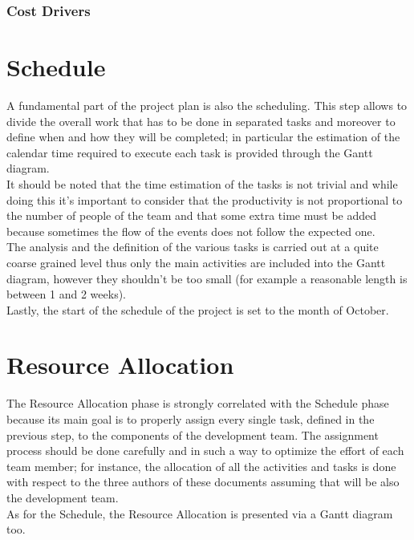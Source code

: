 \documentclass[11pt,a4paper]{report}
\begin{document}
\subsection{Cost Drivers}
\chapter{Schedule}
A fundamental part of the project plan is also the scheduling. This step allows to divide the overall work that has to be done in separated tasks and moreover to define when and how they will be completed; in particular the estimation of the calendar time required to execute each task is provided through the Gantt diagram.\\
It should be noted that the time estimation of the tasks is not trivial and while doing this it's important to consider that the productivity is not proportional to the number of people of the team and that some extra time must be added because sometimes the flow of the events does not follow the expected one.\\
The analysis and the definition of the various tasks is carried out at a quite coarse grained level thus only the main activities are included into the Gantt diagram, however they shouldn't be too small (for example a reasonable length is between 1 and 2 weeks).\\
Lastly, the start of the schedule of the project is set to the month of October.\\
\chapter{Resource Allocation}
The Resource Allocation phase is strongly correlated with the Schedule phase because its main goal is to properly assign every single task, defined in the previous step, to the components of the development team.
The assignment process should be done carefully and in such a way to optimize the effort of each team member; for instance, the allocation of all the activities and tasks is done with respect to the three authors of these documents assuming that will be also the development team.\\
As for the Schedule, the Resource Allocation is presented via a Gantt diagram too.\\
\end{document}
